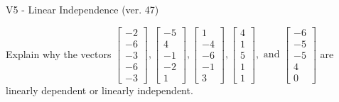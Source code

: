 \begin{exercise}
  \begin{exerciseTitle}V5 - Linear Independence (ver. 47)\end{exerciseTitle}
  \begin{exerciseStatement}
    Explain why the vectors \(\left[\begin{array}{r}
-2 \\
-6 \\
-3 \\
-6 \\
-3
\end{array}\right] , \left[\begin{array}{r}
-5 \\
4 \\
-1 \\
-2 \\
1
\end{array}\right] , \left[\begin{array}{r}
1 \\
-4 \\
-6 \\
-1 \\
3
\end{array}\right] , \left[\begin{array}{r}
4 \\
1 \\
5 \\
1 \\
1
\end{array}\right] , \text{ and } \left[\begin{array}{r}
-6 \\
-5 \\
-5 \\
4 \\
0
\end{array}\right]\) are linearly dependent or linearly independent.	



\end{exerciseStatement}
\end{exercise}
